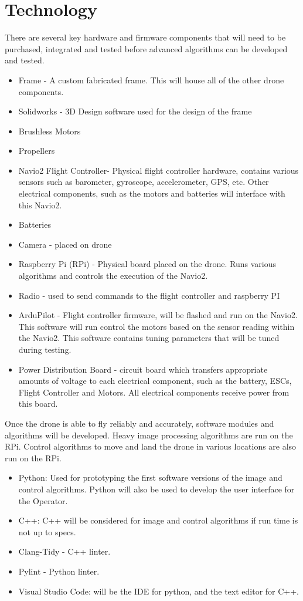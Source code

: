 \documentclass{article}
\begin{document}
\section{Technology}
There are several key hardware and firmware components that will need to be purchased, integrated and tested before advanced algorithms can be developed and tested.  
\begin{itemize}
    \item Frame - A custom fabricated frame. This will house all of the other drone components.
\item Solidworks - 3D Design software used for the design of the frame
\item Brushless Motors
\item Propellers
\item Navio2 Flight Controller- Physical flight controller hardware, contains various sensors such as barometer, gyroscope, accelerometer, GPS, etc. Other electrical components, such as the motors and batteries will interface with this Navio2. 
\item Batteries
\item Camera - placed on drone
\item Raspberry Pi (RPi) - Physical board placed on the drone. Runs various algorithms and controls the execution of the Navio2. 
\item Radio - used to send commands to the flight controller and raspberry PI
\item ArduPilot - Flight controller firmware, will be flashed and run on the Navio2. This software will run control the motors based on the sensor reading within the Navio2. This software contains tuning parameters that will be tuned during testing.
\item Power Distribution Board - circuit board which transfers appropriate amounts of voltage to each electrical component, such as the battery, ESCs, Flight Controller and Motors. All electrical components receive power from this board. 
\end{itemize}


Once the drone is able to fly reliably and accurately, software modules and algorithms will be developed. Heavy image processing algorithms are run on the RPi. Control algorithms to move and land the drone in various locations are also run on the RPi.
\begin{itemize}
    \item  Python: Used for prototyping the first software versions of the image and control algorithms. Python will also be used to develop the user interface for the Operator. 
    \item C++: C++ will be considered for image and control algorithms if run time is not up to specs.
    \item Clang-Tidy - C++ linter.
    \item Pylint - Python linter.
    \item Visual Studio Code: will be the IDE for python, and the text editor for C++.
\end{itemize}
\end{document}
